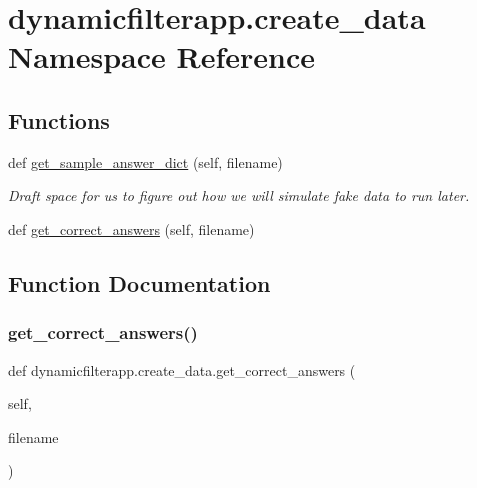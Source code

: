 \hypertarget{namespacedynamicfilterapp_1_1create__data}{}\section{dynamicfilterapp.\+create\+\_\+data Namespace Reference}
\label{namespacedynamicfilterapp_1_1create__data}
\subsection*{Functions}
\begin{DoxyCompactItemize}
\item 
def \hyperlink{namespacedynamicfilterapp_1_1create__data_aa24df140d2fa59bb933f5488cd72cb31}{get\+\_\+sample\+\_\+answer\+\_\+dict} (self, filename)
\begin{DoxyCompactList}\small\item\em Draft space for us to figure out how we will simulate fake data to run later. \end{DoxyCompactList}\item 
def \hyperlink{namespacedynamicfilterapp_1_1create__data_a2d344fba9c998f5b83a36ee3db387806}{get\+\_\+correct\+\_\+answers} (self, filename)
\end{DoxyCompactItemize}


\subsection{Function Documentation}
\mbox{\label{namespacedynamicfilterapp_1_1create__data_a2d344fba9c998f5b83a36ee3db387806}} 
\subsubsection{\texorpdfstring{get\+\_\+correct\+\_\+answers()}{get\_correct\_answers()}}
{\footnotesize\ttfamily def dynamicfilterapp.\+create\+\_\+data.\+get\+\_\+correct\+\_\+answers (\begin{DoxyParamCaption}\item[{}]{self,  }\item[{}]{filename }\end{DoxyParamCaption})}

